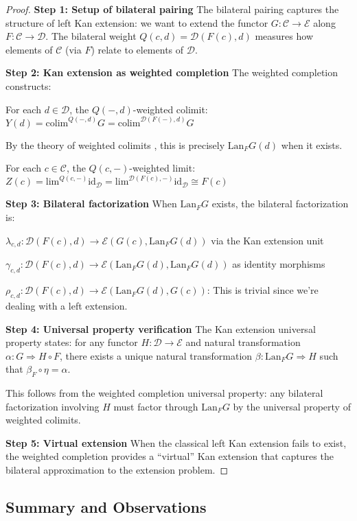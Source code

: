 \documentclass[11pt]{article}
\theoremstyle{plain}
\theoremstyle{definition}
\theoremstyle{remark}
\newcommand{\C}{\mathcal{C}}
\newcommand{\D}{\mathcal{D}}
\newcommand{\E}{\mathcal{E}}
\newcommand{\colim}{\mathrm{colim}}
\renewcommand{\lim}{\mathrm{lim}}
\begin{document}
\begin{proof}
\textbf{Step 1: Setup of bilateral pairing}
The bilateral pairing captures the structure of left Kan extension: we want to extend the functor $G : \C \to \E$ along $F : \C \to \D$. The bilateral weight $Q(c, d) = \D(F(c), d)$ measures how elements of $\C$ (via $F$) relate to elements of $\D$.

\textbf{Step 2: Kan extension as weighted completion}
The weighted completion constructs:

For each $d \in \D$, the $Q(-, d)$-weighted colimit:
$Y(d) = \colim^{Q(-, d)} G = \colim^{\D(F(-), d)} G$

By the theory of weighted colimits \cite{kelly1982basic}, this is precisely $\text{Lan}_F G(d)$ when it exists.

For each $c \in \C$, the $Q(c, -)$-weighted limit:
$Z(c) = \lim^{Q(c, -)} \text{id}_\D = \lim^{\D(F(c), -)} \text{id}_\D \cong F(c)$

\textbf{Step 3: Bilateral factorization}
When $\text{Lan}_F G$ exists, the bilateral factorization is:

$\lambda_{c,d} : \D(F(c), d) \to \E(G(c), \text{Lan}_F G(d))$ via the Kan extension unit

$\gamma_{c,d} : \D(F(c), d) \to \E(\text{Lan}_F G(d), \text{Lan}_F G(d))$ as identity morphisms

$\rho_{c,d} : \D(F(c), d) \to \E(\text{Lan}_F G(d), G(c))$: This is trivial since we're dealing with a left extension.

\textbf{Step 4: Universal property verification}
The Kan extension universal property \cite{kan1958adjoint} states: for any functor $H : \D \to \E$ and natural transformation $\alpha : G \Rightarrow H \circ F$, there exists a unique natural transformation $\beta : \text{Lan}_F G \Rightarrow H$ such that $\beta_F \circ \eta = \alpha$.

This follows from the weighted completion universal property: any bilateral factorization involving $H$ must factor through $\text{Lan}_F G$ by the universal property of weighted colimits.

\textbf{Step 5: Virtual extension}
When the classical left Kan extension fails to exist, the weighted completion provides a ``virtual'' Kan extension that captures the bilateral approximation to the extension problem.
\end{proof}

\subsection{Summary and Observations}
\end{document}
